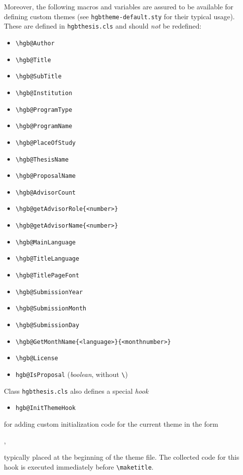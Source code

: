 \documentclass[english]{hgbarticle}
\begin{document}
\noindent
Moreover, the following macros and variables are assured to be available for defining custom themes
(see \texttt{hgbtheme-default.sty} for their typical usage).
These are defined in \texttt{hgbthesis.cls} and should \emph{not} be redefined:
%
\begin{itemize}
  \item[] \verb!\hgb@Author!
  \item[] \verb!\hgb@Title!
  \item[] \verb!\hgb@SubTitle!
  \item[] \verb!\hgb@Institution!
  \item[] \verb!\hgb@ProgramType!
  \item[] \verb!\hgb@ProgramName!
  \item[] \verb!\hgb@PlaceOfStudy!
\medskip
	\item[] \verb!\hgb@ThesisName!
	\item[] \verb!\hgb@ProposalName!
\medskip
  \item[] \verb!\hgb@AdvisorCount!
  \item[] \verb!\hgb@getAdvisorRole{<number>}!
  \item[] \verb!\hgb@getAdvisorName{<number>}!
\medskip
  \item[] \verb!\hgb@MainLanguage!
  \item[] \verb!\hgb@TitleLanguage!
  \item[] \verb!\hgb@TitlePageFont!
\medskip 
  \item[] \verb!\hgb@SubmissionYear!
  \item[] \verb!\hgb@SubmissionMonth!
  \item[] \verb!\hgb@SubmissionDay!
  \item[] \verb!\hgb@GetMonthName{<language>}{<monthnumber>}!
\medskip
	\item[] \verb!\hgb@License!
\medskip
  \item[] \verb!hgb@IsProposal! (\emph{boolean}, without \verb!\!)
\end{itemize}

\noindent
Class \texttt{hgbthesis.cls} also defines a special \emph{hook}
\begin{itemize}
\item[] \verb!hgb@InitThemeHook!
\end{itemize}
for adding custom initialization code for the current theme in the form
%
\begin{LaTeXCode}[numbers=none]
,
\end{LaTeXCode}
%
typically placed at the beginning of the theme file. The collected code for
this hook is executed immediately before \verb!\maketitle!.
\end{document}
